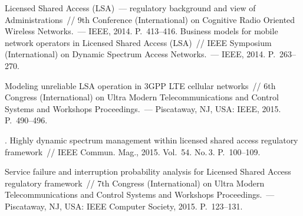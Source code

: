 \begin{multicols}{2}
{{\begin{thebibliography}{99}
 Licensed Shared Access (LSA)~--- regulatory 
background and view of Administrations~// 9th Conference (International) on Cognitive Radio 
Oriented Wireless Networks.~--- IEEE, 2014. P.~413--416.
 Business models for mobile network 
operators in Licensed Shared Access (LSA)~// IEEE Symposium (International) on Dynamic 
Spectrum Access Networks.~--- IEEE, 2014. P.~263--270.


 Modeling unreliable LSA operation in 3GPP LTE cellular 
networks~// 6th Congress (International) on Ultra Modern Telecommunications and Control 
Systems and Workshops Proceedings.~--- Piscataway, NJ, USA: IEEE, 2015. 
P.~490--496.

. 
Highly dynamic spectrum management within licensed shared access regulatory framework~// 
IEEE Commun. Mag., 2015. Vol.~54. No.\,3. P.~100--109.

 Service failure and 
interruption probability analysis for Licensed Shared Access regulatory framework~// 7th Congress 
(International) on Ultra Modern Telecommunications and Control Systems and Workshops
 Proceedings.~--- Piscataway, NJ, USA: IEEE Computer Society, 2015. P.~123--131.


\end{thebibliography}}}
\end{multicols}
